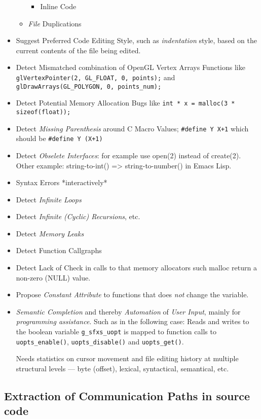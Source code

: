 \documentclass[a4paper,10pt,twocolumn]{article}
\begin{document}
\begin{itemize}
\begin{itemize}
\begin{itemize}
    \item Inline Code
    \end{itemize}
  \item \emph{File} Duplications
  \end{itemize}
\item Suggest Preferred Code Editing Style, such as \emph{indentation} style,
  based on the current contents of the file being edited.
\item Detect Mismatched combination of OpenGL Vertex Arrays Functions like
  {\centering \texttt{glVertexPointer(2, GL_FLOAT, 0, points);} and
    \texttt{glDrawArrays(GL_POLYGON, 0, points_num);} }
\item Detect Potential Memory Allocation Bugs like {\centering \texttt{int * x =
      malloc(3 * sizeof(float));} }
\item Detect \emph{Missing Parenthesis} around C Macro Values; {\centering
    \texttt{\#define Y X+1} which should be \texttt{\#define Y (X+1)} }
\item Detect \emph{Obselete Interfaces}: for example use open(2) instead of
  create(2). Other example: string-to-int() => string-to-number() in Emacs Lisp.
\item Syntax Errors *interactively*
\item Detect \emph{Infinite Loops}
\item Detect \emph{Infinite (Cyclic) Recursions}, etc.
\item Detect \emph{Memory Leaks}
\item Detect Function Callgraphs
\item Detect Lack of Check in calls to that memory allocators such malloc return
  a non-zero (NULL) value.
\item Propose \emph{Constant Attribute} to functions that does \emph{not} change
  the variable.
\item \emph{Semantic Completion} and thereby \emph{Automation} of \emph{User
    Input}, mainly for \emph{programming assistance}. Such as in the following
  case: Reads and writes to the boolean variable \texttt{g_sfxs_uopt} is
  mapped to function calls to \texttt{uopts_enable()},
  \texttt{uopts_disable()} and \texttt{uopts_get()}.

  Needs statistics on cursor movement and file editing history at multiple
  structural levels --- byte (offset), lexical, syntactical, semantical, etc.
\end{itemize}

\subsection{Extraction of Communication Paths in source code }
\end{document}

